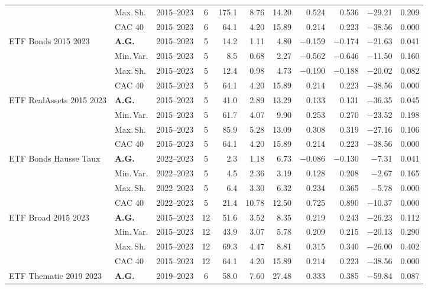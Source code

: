 \begin{longtable}{p{2.6cm} l c c r r r r r r r}
 & Max.\,Sh. & 2015--2023 & 6 & 175.1 & 8.76 & 14.20 & 0.524 & 0.536 & $-$29.21 & 0.209 \\
 & CAC 40 & 2015--2023 & 6 & 64.1 & 4.20 & 15.89 & 0.214 & 0.223 & $-$38.56 & 0.000 \\
\midrule
ETF Bonds 2015 2023 & \textbf{A.G.} & 2015--2023 & 5 & 14.2 & 1.11 & 4.80 & $-$0.159 & $-$0.174 & $-$21.63 & 0.041 \\
 & Min.\,Var. & 2015--2023 & 5 & 8.5 & 0.68 & 2.27 & $-$0.562 & $-$0.646 & $-$11.50 & 0.160 \\
 & Max.\,Sh. & 2015--2023 & 5 & 12.4 & 0.98 & 4.73 & $-$0.190 & $-$0.188 & $-$20.02 & 0.082 \\
 & CAC 40 & 2015--2023 & 5 & 64.1 & 4.20 & 15.89 & 0.214 & 0.223 & $-$38.56 & 0.000 \\
\midrule
ETF RealAssets 2015 2023 & \textbf{A.G.} & 2015--2023 & 5 & 41.0 & 2.89 & 13.29 & 0.133 & 0.131 & $-$36.35 & 0.045 \\
 & Min.\,Var. & 2015--2023 & 5 & 61.7 & 4.07 & 9.90 & 0.253 & 0.270 & $-$23.52 & 0.198 \\
 & Max.\,Sh. & 2015--2023 & 5 & 85.9 & 5.28 & 13.09 & 0.308 & 0.319 & $-$27.16 & 0.106 \\
 & CAC 40 & 2015--2023 & 5 & 64.1 & 4.20 & 15.89 & 0.214 & 0.223 & $-$38.56 & 0.000 \\
\midrule
ETF Bonds Hausse Taux & \textbf{A.G.} & 2022--2023 & 5 & 2.3 & 1.18 & 6.73 & $-$0.086 & $-$0.130 & $-$7.31 & 0.041 \\
 & Min.\,Var. & 2022--2023 & 5 & 4.5 & 2.36 & 3.19 & 0.128 & 0.208 & $-$2.67 & 0.165 \\
 & Max.\,Sh. & 2022--2023 & 5 & 6.4 & 3.30 & 6.32 & 0.234 & 0.365 & $-$5.78 & 0.000 \\
 & CAC 40 & 2022--2023 & 5 & 21.4 & 10.78 & 12.50 & 0.725 & 0.890 & $-$10.37 & 0.000 \\
\midrule
ETF Broad 2015 2023 & \textbf{A.G.} & 2015--2023 & 12 & 51.6 & 3.52 & 8.35 & 0.219 & 0.243 & $-$26.23 & 0.112 \\
 & Min.\,Var. & 2015--2023 & 12 & 43.9 & 3.07 & 5.78 & 0.209 & 0.215 & $-$20.13 & 0.290 \\
 & Max.\,Sh. & 2015--2023 & 12 & 69.3 & 4.47 & 8.81 & 0.315 & 0.340 & $-$26.00 & 0.402 \\
 & CAC 40 & 2015--2023 & 12 & 64.1 & 4.20 & 15.89 & 0.214 & 0.223 & $-$38.56 & 0.000 \\
\midrule
ETF Thematic 2019 2023 & \textbf{A.G.} & 2019--2023 & 6 & 58.0 & 7.60 & 27.48 & 0.333 & 0.385 & $-$59.84 & 0.087 \\

\end{longtable}

